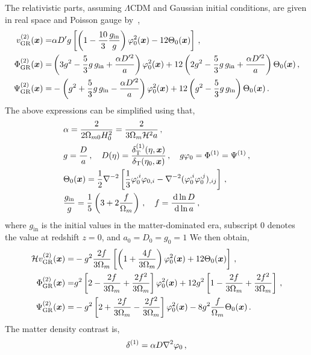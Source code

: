 The relativistic parts, assuming $\Lambda$CDM and Gaussian initial conditions, are given in real space and Poisson gauge by~\cite{Villa:2015ppa},
\begin{align}
	v^{(2)}_{\mathrm{GR}}(\bm {x}) =& \alpha D' g \left[ \left( 1 - \frac{10}{3} \frac{g_\mathrm{in}}{g} \right) \varphi_0^2(\bm {x}) - 12 \Theta_0(\bm {x}) \right]\,, \\
	\Phi^{(2)}_{\mathrm{GR}}(\bm {x}) =& \left(3 g^2 - \frac{5}{3} g\,g_\mathrm{in} + \frac{\alpha D'^2}{a} \right) \varphi_0^2(\bm {x}) + 12 \left( 2 g^2 - \frac{5}{3} g\,g_\mathrm{in} + \frac{\alpha D'^2}{a} \right) \Theta_0(\bm {x})\,,\\
	\Psi^{(2)}_{\mathrm{GR}}(\bm {x}) =& - \left( g^2 + \frac{5}{3} g\,g_\mathrm{in} - \frac{\alpha D'^2}{a} \right) \varphi_0^2(\bm {x}) + 12 \left( g^2 - \frac{5}{3} g\,g_\mathrm{in} \right) \Theta_0(\bm {x})\,.
\end{align}
The above expressions can be simplified using that, 
\begin{align}
	&\alpha = \frac{2}{2 \Omega_{m0} H_0^2} = \frac{2}{3 \Omega_m \mathcal{H}^2 a}\,,\label{eq:defalpha}\\
	& g = \frac{D}{a}\,,\quad D(\eta) = \frac{\delta_\mathrm{T}^{(1)}(\eta,\bm {x})}{\delta_{\mathrm{T}}(\eta_0,\bm {x})}\,,\quad g \varphi_0 = \Phi^{(1)} = \Psi^{(1)}\,,\label{eq:defgDvarphireln} \\
	&\Theta_0(\bm {x}) = \frac{1}{2} \nabla^{-2} \left[ \frac{1}{3} \varphi^{,i}_0 \varphi_{0,i} - \nabla^{-2} (\varphi^{,i}_0 \varphi^{,j}_0)_{,ij} \right]\,,\\
	&\frac{g_\mathrm{in}}{g} = \frac{1}{5} \left( 3 + 2 \frac{f}{\Omega_m} \right)\,,\quad f = \frac{\,\mathrm{d} \ln D}{\,\mathrm{d} \ln a}\,,
\end{align}
where $g_\mathrm{in}$ is the initial values in the matter-dominated era, subscript 0 denotes the value at redshift $z = 0$, and $a_0 = D_0 = g_0 = 1$ 
We then obtain,
\begin{align}
	\mathcal{H} v^{(2)}_{\mathrm{GR}}(\bm {x}) =& -g^2 \frac{2f}{3\Omega_m} \left[ \left( 1 + \frac{4 f}{3 \Omega_m} \right) \varphi_0^2(\bm {x}) + 12 \Theta_0 (\bm {x}) \right]\,,\\
	\Phi^{(2)}_{\mathrm{GR}}(\bm {x}) =& g^2 \left[ 2 - \frac{2 f}{3 \Omega_m} + \frac{2 f^2}{3 \Omega_m} \right] \varphi_0^2(\bm {x}) + 12 g^2 \left[ 1 - \frac{2f}{3 \Omega_m} + \frac{2 f^2}{3 \Omega_m} \right]\,,\\
	\Psi^{(2)}_{\mathrm{GR}}(\bm {x}) =& -g^2 \left[ 2 + \frac{2 f}{3 \Omega_m} - \frac{2 f^2}{3 \Omega_m} \right] \varphi_0^2(\bm {x}) - 8 g^2 \frac{f}{\Omega_m} \Theta_0(\bm {x})\,.
\end{align}
The matter density contrast is, 
\begin{equation}
	\delta^{(1)} = \alpha D \nabla^2 \varphi_0\,,
\end{equation}
